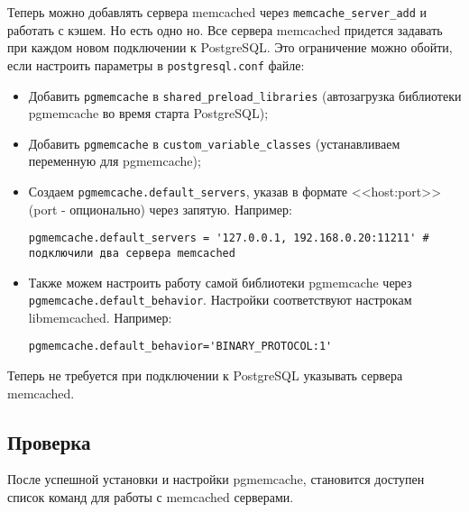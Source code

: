 Теперь можно добавлять сервера memcached через \lstinline!memcache_server_add! и работать с кэшем. Но есть одно но. Все сервера memcached придется задавать при каждом новом подключении к PostgreSQL. Это ограничение можно обойти, если настроить параметры в \lstinline!postgresql.conf! файле:

\begin{itemize}
  \item Добавить \lstinline!pgmemcache! в \lstinline!shared_preload_libraries! (автозагрузка библиотеки pgmemcache во время старта PostgreSQL);
  \item Добавить \lstinline!pgmemcache! в \lstinline!custom_variable_classes! (устанавливаем переменную для pgmemcache);
  \item Создаем \lstinline!pgmemcache.default_servers!, указав в формате <<host:port>> (port - опционально) через запятую. Например:

\begin{lstlisting}[label=lst:pgcache6,caption=Настройка default\_servers]
pgmemcache.default_servers = '127.0.0.1, 192.168.0.20:11211' # подключили два сервера memcached
\end{lstlisting}

\item Также можем настроить работу самой библиотеки pgmemcache через \lstinline!pgmemcache.default_behavior!. Настройки соответствуют настрокам libmemcached. Например:

\begin{lstlisting}[label=lst:pgcache7,caption=Настройка pgmemcache]
pgmemcache.default_behavior='BINARY_PROTOCOL:1'
\end{lstlisting}

\end{itemize}

Теперь не требуется при подключении к PostgreSQL указывать сервера memcached.


\subsection{Проверка}

После успешной установки и настройки pgmemcache, становится доступен список команд для работы с memcached серверами.

